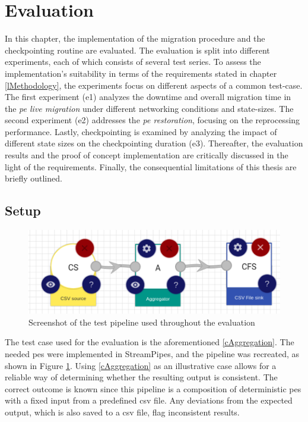 \section{Evaluation}
\label{lEvaluation}

In this chapter, the implementation of the migration procedure and the checkpointing routine are evaluated. The evaluation is split into different experiments, each of which consists of several test series. To assess the implementation's suitability in terms of the requirements stated in chapter \ref{lMethodology}, the experiments focus on different aspects of a common test-case. The first experiment (\acrshort{e}1) analyzes the downtime and overall migration time in the \textit{\acrshort{pe} live migration} under different networking conditions and state-sizes. The second experiment (\acrshort{e}2) addresses the \textit{\acrshort{pe} restoration}, focusing on the reprocessing performance. Lastly, checkpointing is examined by analyzing the impact of different state sizes on the checkpointing duration (\acrshort{e}3). Thereafter, the evaluation results and the proof of concept implementation are critically discussed in the light of the requirements. Finally, the consequential limitations of this thesis are briefly outlined.

\subsection{Setup}

\label{lEvaluationSetup}
\begin{figure}[!ht]
    \centering
    \graphicspath{{./figures/code/}}
    \includegraphics[width=\textwidth]{figures/visualizations/EvaluationPipelineSceenshot_1500.png}
    \caption{Screenshot of the test pipeline used throughout the evaluation}
    \label{fEvaluationPipeline}
\end{figure}

The test case used for the evaluation is the aforementioned \ref{cAggregation}. The needed \gls{pe}s were implemented in StreamPipes, and the pipeline was recreated, as shown in Figure \ref{fEvaluationPipeline}. Using \ref{cAggregation} as an illustrative case allows for a reliable way of determining whether the resulting output is consistent. The correct outcome is known since this pipeline is a composition of deterministic \gls{pe}s with a fixed input from a predefined \gls{csv} file. Any deviations from the expected output, which is also saved to a \gls{csv} file, flag inconsistent results.\par


